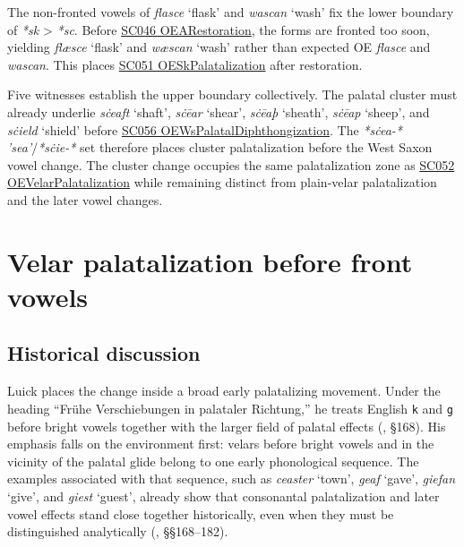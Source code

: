 \documentclass[
  british,
  a4paper,
  openany]{book}
\begin{document}
The non-fronted vowels of \emph{flasce} `flask' and \emph{wascan} `wash'
fix the lower boundary of \emph{*sk} \textgreater{} \emph{*sc}. Before
\hyperref[rule-OEARestoration]{SC046 OEARestoration}, the forms are
fronted too soon, yielding \emph{flæsce} `flask' and \emph{wæscan}
`wash' rather than expected OE \emph{flasce} and \emph{wascan}. This
places \hyperref[rule-OESkPalatalization]{SC051 OESkPalatalization}
after restoration.

Five witnesses establish the upper boundary collectively. The palatal
cluster must already underlie \emph{sċeaft} `shaft', \emph{sċēar}
`shear', \emph{sċēaþ} `sheath', \emph{sċēap} `sheep', and \emph{sċield}
`shield' before \hyperref[rule-OEWsPalatalDiphthongization]{SC056
OEWsPalatalDiphthongization}. The \emph{*sċea-* 'sea'}/\emph{*sċie-*}
set therefore places cluster palatalization before the West Saxon vowel
change. The cluster change occupies the same palatalization zone as
\hyperref[rule-OEVelarPalatalization]{SC052 OEVelarPalatalization} while
remaining distinct from plain-velar palatalization and the later vowel
changes.

\newpage

\section{Velar palatalization before front
vowels}\label{velar-palatalization-before-front-vowels}

\subsection{Historical discussion}\label{historical-discussion-28}

Luick places the change inside a broad early palatalizing movement.
Under the heading ``Frühe Verschiebungen in palataler Richtung,'' he
treats English \texttt{k} and \texttt{g} before bright vowels together
with the larger field of palatal effects (, §168). His emphasis falls on the environment first:
velars before bright vowels and in the vicinity of the palatal glide
belong to one early phonological sequence. The examples associated with
that sequence, such as \emph{ceaster} `town', \emph{geaf} `gave',
\emph{giefan} `give', and \emph{giest} `guest', already show that
consonantal palatalization and later vowel effects stand close together
historically, even when they must be distinguished analytically
(, §§168--182).
\end{document}
